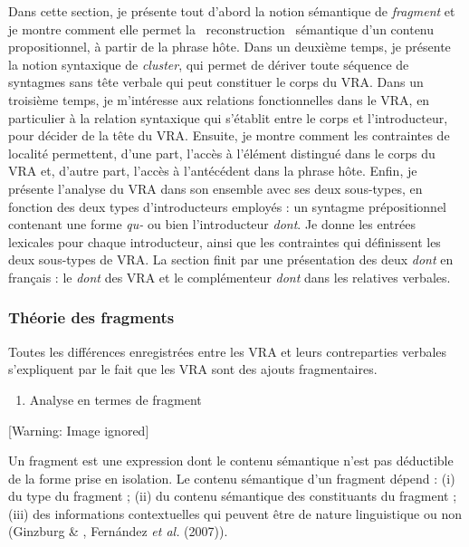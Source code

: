 Dans cette section, je présente tout d'abord la notion sémantique de \textit{fragment} et je montre comment elle permet la {\guillemotleft}~reconstruction~{\guillemotright} sémantique d'un contenu propositionnel, à partir de la phrase hôte. Dans un deuxième temps, je présente la notion syntaxique de \textit{cluster}, qui permet de dériver toute séquence de syntagmes sans tête verbale qui peut constituer le corps du VRA. Dans un troisième temps, je m'intéresse aux relations fonctionnelles dans le VRA, en particulier à la relation syntaxique qui s'établit entre le corps et l'introducteur, pour décider de la tête du VRA. Ensuite, je montre comment les contraintes de localité permettent, d'une part, l'accès à l'élément distingué dans le corps du VRA et, d'autre part, l'accès à l'antécédent dans la phrase hôte. Enfin, je présente l'analyse du VRA dans son ensemble avec ses deux sous-types, en fonction des deux types d'introducteurs employés : un syntagme prépositionnel contenant une forme \textit{qu-} ou bien l'introducteur \textit{dont}. Je donne les entrées lexicales pour chaque introducteur, ainsi que les contraintes qui définissent les deux sous-types de VRA. La section finit par une présentation des deux \textit{dont} en français : le \textit{dont} des VRA et le complémenteur \textit{dont} dans les relatives verbales. 

\subsubsection{Théorie des fragments}
\label{bkm:Ref299024693}Toutes les différences enregistrées entre les VRA et leurs contreparties verbales s'expliquent par le fait que les VRA sont des ajouts fragmentaires.


\begin{enumerate}
\item Analyse en termes de fragment 


\end{enumerate}
{   [Warning: Image ignored] %
} 

Un fragment est une expression dont le contenu sémantique n'est pas déductible de la forme prise en isolation. Le contenu sémantique d'un fragment dépend : (i) du type du fragment ; (ii) du contenu sémantique des constituants du fragment ; (iii) des informations contextuelles qui peuvent être de nature linguistique ou non (Ginzburg \& \citet{Sag2000}, Fern\'andez \textit{et al.} (2007)). 


